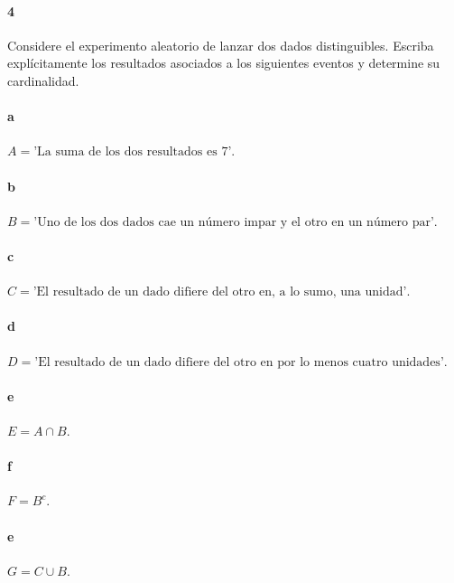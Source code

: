 \documentclass{article}
\begin{document}
\paragraph{4} Considere el experimento aleatorio de lanzar dos dados distinguibles. Escriba explícitamente los resultados asociados a los siguientes eventos y determine su cardinalidad.
\paragraph{a} $A = \text{'La suma de los dos resultados es 7'}$.
\paragraph{b} $B = \text{'Uno de los dos dados cae un número impar y el otro en un número par'}$.
\paragraph{c} $C = \text{'El resultado de un dado difiere del otro en, a lo sumo, una unidad'}$.
\paragraph{d} $D = \text{'El resultado de un dado difiere del otro en por lo menos cuatro unidades'}$.
\paragraph{e} $E = A \cap B$.
\paragraph{f} $F = B^{c}$.
\paragraph{e} $G = C \cup B$.
\end{document}

